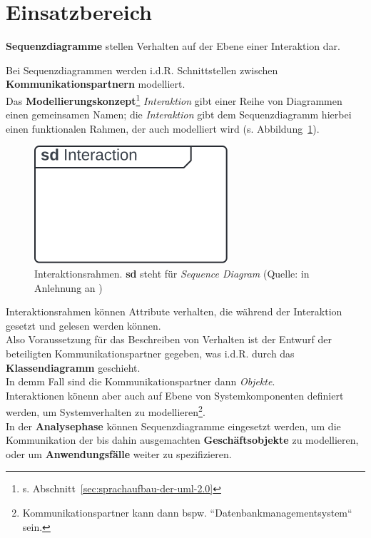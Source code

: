 \section{Einsatzbereich}

\begin{tcolorbox}
    \textbf{Sequenzdiagramme} stellen Verhalten auf der Ebene einer Interaktion dar.
\end{tcolorbox}

\noindent
Bei Sequenzdiagrammen werden i.d.R. Schnittstellen zwischen \textbf{Kommunikationspartnern} modelliert.\\

\noindent
Das \textbf{Modellierungskonzept}\footnote{
s. Abschnitt~\ref{sec:sprachaufbau-der-uml-2.0}
} \textit{Interaktion} gibt einer Reihe von Diagrammen einen gemeinsamen Namen; die \textit{Interaktion} gibt dem Sequenzdiagramm hierbei einen funktionalen Rahmen, der auch modelliert wird (s. Abbildung~\ref{fig:interaktionsrahmen}).\\

\begin{figure}
    \centering
    \includegraphics[scale=0.5]{part three/Sequenzdiagramme/img/interaktionsrahmen}
    \caption{Interaktionsrahmen. \textbf{sd} steht für \textit{Sequence Diagram} (Quelle: in Anlehnung an \cite[596]{OMG17})}
    \label{fig:interaktionsrahmen}
\end{figure}

\noindent
Interaktionsrahmen können Attribute verhalten, die während der Interaktion gesetzt und gelesen werden können.\\

\noindent
Also Voraussetzung für das Beschreiben von Verhalten ist der Entwurf der beteiligten Kommunikationspartner gegeben, was i.d.R. durch das \textbf{Klassendiagramm} geschieht.\\
In demm Fall sind die Kommunikationspartner dann \textit{Objekte}.\\

\noindent
Interaktionen könenn aber auch auf Ebene von Systemkomponenten definiert werden, um Systemverhalten zu modellieren\footnote{
Kommunikationspartner kann dann bspw. ``Datenbankmanagementsystem`` sein.
}.\\

\noindent
In der \textbf{Analysephase} können Sequenzdiagramme eingesetzt werden, um die Kommunikation der bis dahin ausgemachten \textbf{Geschäftsobjekte} zu modellieren, oder um \textbf{Anwendungsfälle} weiter zu spezifizieren.